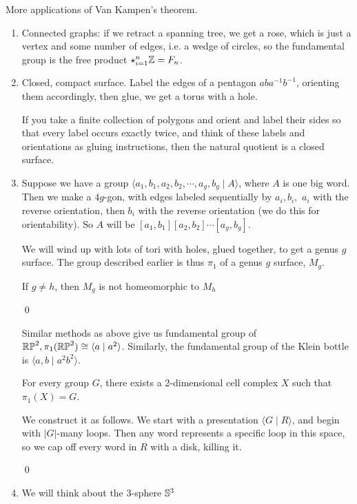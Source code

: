 \documentclass[x11names,reqno,14pt]{extarticle}
\begin{document}
More applications of Van Kampen's theorem. 

\begin{enumerate}

\item Connected graphs: if we retract a spanning tree, we get a rose, which is just a vertex and some number of edges, i.e. a wedge of circles, so the fundamental group is the free product $\star_{i=1}^n\mathbb{Z} = F_n$. 

\item Closed, compact surface. Label the edges of a pentagon $aba^{-1}b^{-1}$, orienting them accordingly, then glue, we get a torus with a hole.
 

\rem

If you take a finite collection of polygons and orient and label their sides so that every label occurs exactly twice, and think of these labels and orientations as gluing instructions, then the natural quotient is a closed surface. 

\item Suppose we have a group $\langle a_1, b_1, a_2, b_2, \cdots, a_g, b_g \mid A \rangle$, where $A$ is one big word. Then we make a $4g$-gon, with edges labeled sequentially by $a_i,b_i,$ $a_i$ with the reverse orientation, then $b_i$ with the reverse orientation (we do this for orientability). So $A$ will be $[a_1,b_1][a_2,b_2]\cdots[a_g,b_g]$. 

We will wind up with lots of tori with holes, glued together, to get a genus $g$ surface. The group described earlier is thus $\pi_1$ of a genus $g$ surface, $M_g$.

\cor

If $g \neq h$, then $M_g$ is not homeomorphic to $M_h$

\proof

\qed

Similar methods as above give us fundamental group of ${\mathbb{RP}}^2, \pi_1({\mathbb{RP}}^2)\cong \langle a \mid a^2 \rangle$. Similarly, the fundamental group of the Klein bottle is $\langle a, b \mid a^2b^2 \rangle$.

\cor

For every group $G$, there exists a 2-dimensional cell complex $X$ such that $\pi_1(X) = G$.

\proof

We construct it as follows. We start with a presentation $\langle G \mid R \rangle$, and begin with $|G|$-many loops. Then any word represents a specific loop in this space, so we cap off every word in $R$ with a disk, killing it.

\qed

\item We will think about the 3-sphere $\mathbb{S}^3$ 


\end{enumerate}
\end{document}
